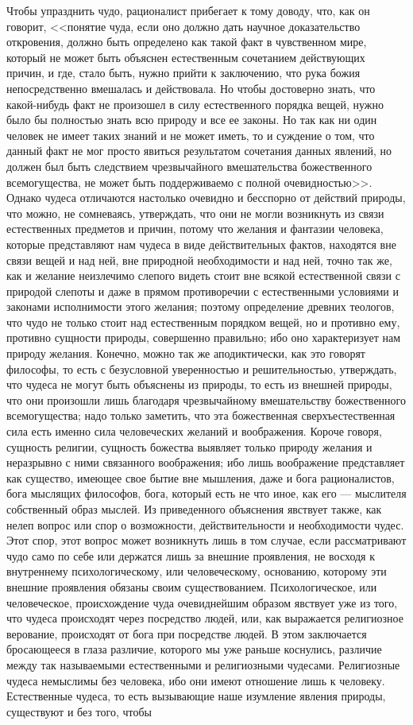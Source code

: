 \documentclass[12pt]{article}
\begin{document}
Чтобы упразднить чудо, рационалист прибегает к тому доводу, что, как он говорит, <<понятие чуда, если оно должно дать научное доказательство откровения, должно быть определено как такой факт в чувственном мире, который не может быть объяснен естественным сочетанием действующих причин, и где, стало быть, нужно прийти к заключению, что рука божия непосредственно вмешалась и действовала. Но чтобы достоверно знать, что какой-нибудь факт не произошел в силу естественного порядка вещей, нужно было бы полностью знать всю природу и все ее законы. Но так как ни один человек не имеет таких знаний и не может иметь, то и суждение о том, что данный факт не мог просто явиться результатом сочетания данных явлений, но должен был быть следствием чрезвычайного вмешательства божественного всемогущества, не может быть поддерживаемо с полной очевидностью>>. Однако чудеса отличаются настолько очевидно и бесспорно от действий природы, что можно, не сомневаясь, утверждать, что они не могли возникнуть из связи естественных предметов и причин, потому что желания и фантазии человека, которые представляют нам чудеса в виде действительных фактов, находятся вне связи вещей и над ней, вне природной необходимости и над ней, точно так же, как и желание неизлечимо слепого видеть стоит вне всякой естественной связи с природой слепоты и даже в прямом противоречии с естественными условиями и законами исполнимости этого желания; поэтому определение древних теологов, что чудо не только стоит над естественным порядком вещей, но и противно ему, противно сущности природы, совершенно правильно; ибо оно характеризует нам природу желания. Конечно, можно так же аподиктически, как это говорят философы, то есть с безусловной уверенностью и решительностью, утверждать, что чудеса не могут быть объяснены из природы, то есть из внешней природы, что они произошли лишь благодаря чрезвычайному вмешательству божественного всемогущества; надо только заметить, что эта божественная сверхъестественная сила есть именно сила человеческих желаний и воображения. Короче говоря, сущность религии, сущность божества выявляет только природу желания и неразрывно с ними связанного воображения; ибо лишь воображение представляет как существо, имеющее свое бытие вне мышления, даже и бога рационалистов, бога мыслящих философов, бога, который есть не что иное, как его --- мыслителя собственный образ мыслей. Из приведенного объяснения явствует также, как нелеп вопрос или спор о возможности, действительности и необходимости чудес. Этот спор, этот вопрос может возникнуть лишь в том случае, если рассматривают чудо само по себе или держатся лишь за внешние проявления, не восходя к внутреннему психологическому, или человеческому, основанию, которому эти внешние проявления обязаны своим существованием. Психологическое, или человеческое, происхождение чуда очевиднейшим образом явствует уже из того, что чудеса происходят через посредство людей, или, как выражается религиозное верование, происходят от бога при посредстве людей. В этом заключается бросающееся в глаза различие, которого мы уже раньше коснулись, различие между так называемыми естественными и религиозными чудесами. Религиозные чудеса немыслимы без человека, ибо они имеют отношение лишь к человеку. Естественные чудеса, то есть вызывающие наше изумление явления природы, существуют и без того, чтобы 
\end{document}
